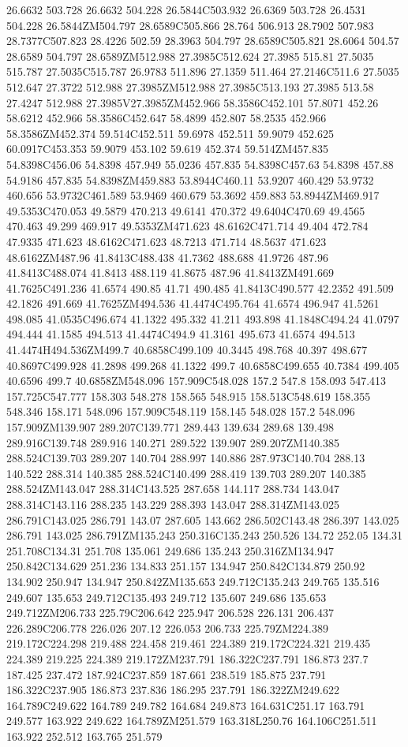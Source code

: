 26.6632 503.728 26.6632 504.228 26.5844C503.932 26.6369 503.728 26.4531 504.228 26.5844ZM504.797 28.6589C505.866 28.764 506.913 28.7902 507.983 28.7377C507.823 28.4226 502.59 28.3963 504.797 28.6589C505.821 28.6064 504.57 28.6589 504.797 28.6589ZM512.988 27.3985C512.624 27.3985 515.81 27.5035 515.787 27.5035C515.787 26.9783 511.896 27.1359 511.464 27.2146C511.6 27.5035 512.647 27.3722 512.988 27.3985ZM512.988 27.3985C513.193 27.3985 513.58 27.4247 512.988 27.3985V27.3985ZM452.966 58.3586C452.101 57.8071 452.26 58.6212 452.966 58.3586C452.647 58.4899 452.807 58.2535 452.966 58.3586ZM452.374 59.514C452.511 59.6978 452.511 59.9079 452.625 60.0917C453.353 59.9079 453.102 59.619 452.374 59.514ZM457.835 54.8398C456.06 54.8398 457.949 55.0236 457.835 54.8398C457.63 54.8398 457.88 54.9186 457.835 54.8398ZM459.883 53.8944C460.11 53.9207 460.429 53.9732 460.656 53.9732C461.589 53.9469 460.679 53.3692 459.883 53.8944ZM469.917 49.5353C470.053 49.5879 470.213 49.6141 470.372 49.6404C470.69 49.4565 470.463 49.299 469.917 49.5353ZM471.623 48.6162C471.714 49.404 472.784 47.9335 471.623 48.6162C471.623 48.7213 471.714 48.5637 471.623 48.6162ZM487.96 41.8413C488.438 41.7362 488.688 41.9726 487.96 41.8413C488.074 41.8413 488.119 41.8675 487.96 41.8413ZM491.669 41.7625C491.236 41.6574 490.85 41.71 490.485 41.8413C490.577 42.2352 491.509 42.1826 491.669 41.7625ZM494.536 41.4474C495.764 41.6574 496.947 41.5261 498.085 41.0535C496.674 41.1322 495.332 41.211 493.898 41.1848C494.24 41.0797 494.444 41.1585 494.513 41.4474C494.9 41.3161 495.673 41.6574 494.513 41.4474H494.536ZM499.7 40.6858C499.109 40.3445 498.768 40.397 498.677 40.8697C499.928 41.2898 499.268 41.1322 499.7 40.6858C499.655 40.7384 499.405 40.6596 499.7 40.6858ZM548.096 157.909C548.028 157.2 547.8 158.093 547.413 157.725C547.777 158.303 548.278 158.565 548.915 158.513C548.619 158.355 548.346 158.171 548.096 157.909C548.119 158.145 548.028 157.2 548.096 157.909ZM139.907 289.207C139.771 289.443 139.634 289.68 139.498 289.916C139.748 289.916 140.271 289.522 139.907 289.207ZM140.385 288.524C139.703 289.207 140.704 288.997 140.886 287.973C140.704 288.13 140.522 288.314 140.385 288.524C140.499 288.419 139.703 289.207 140.385 288.524ZM143.047 288.314C143.525 287.658 144.117 288.734 143.047 288.314C143.116 288.235 143.229 288.393 143.047 288.314ZM143.025 286.791C143.025 286.791 143.07 287.605 143.662 286.502C143.48 286.397 143.025 286.791 143.025 286.791ZM135.243 250.316C135.243 250.526 134.72 252.05 134.31 251.708C134.31 251.708 135.061 249.686 135.243 250.316ZM134.947 250.842C134.629 251.236 134.833 251.157 134.947 250.842C134.879 250.92 134.902 250.947 134.947 250.842ZM135.653 249.712C135.243 249.765 135.516 249.607 135.653 249.712C135.493 249.712 135.607 249.686 135.653 249.712ZM206.733 225.79C206.642 225.947 206.528 226.131 206.437 226.289C206.778 226.026 207.12 226.053 206.733 225.79ZM224.389 219.172C224.298 219.488 224.458 219.461 224.389 219.172C224.321 219.435 224.389 219.225 224.389 219.172ZM237.791 186.322C237.791 186.873 237.7 187.425 237.472 187.924C237.859 187.661 238.519 185.875 237.791 186.322C237.905 186.873 237.836 186.295 237.791 186.322ZM249.622 164.789C249.622 164.789 249.782 164.684 249.873 164.631C251.17 163.791 249.577 163.922 249.622 164.789ZM251.579 163.318L250.76 164.106C251.511 163.922 252.512 163.765 251.579 